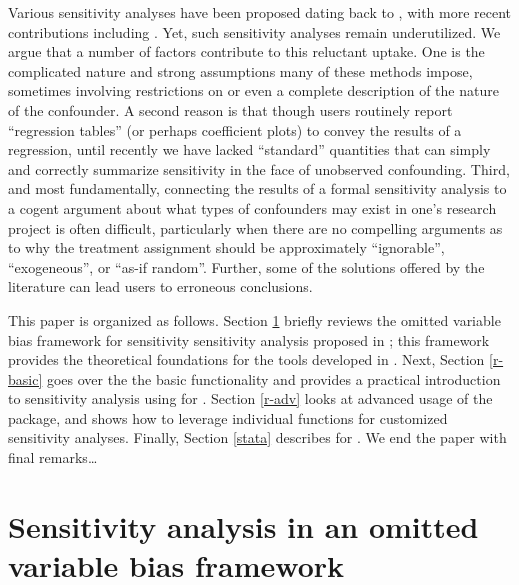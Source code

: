 \documentclass[
]{jss}
\begin{document}
Various sensitivity analyses have been proposed dating back to
\citet{cornfield1959smoking}, with more recent contributions including
\citep{rosenbaum1983assessing, robins1999association, frank:smr2000, rosenbaum2002gamma, imbens2003sensitivity, brumback2004sensitivity, frank:eepa2008, hosman2010sensitivity, imai2010identification, arah2011, blackwell2013selection, frank2013would, carnegie:jree2016, dorie2016flexible, middleton2016bias, oster:jbes2017, cinelli:icml2019, franks:jasa2019}.
Yet, such sensitivity analyses remain underutilized. We argue that a
number of factors contribute to this reluctant uptake. One is the
complicated nature and strong assumptions many of these methods impose,
sometimes involving restrictions on or even a complete description of
the nature of the confounder. A second reason is that though users
routinely report ``regression tables'' (or perhaps coefficient plots) to
convey the results of a regression, until recently we have lacked
``standard'' quantities that can simply and correctly summarize
sensitivity in the face of unobserved confounding. Third, and most
fundamentally, connecting the results of a formal sensitivity analysis
to a cogent argument about what types of confounders may exist in one's
research project is often difficult, particularly when there are no
compelling arguments as to why the treatment assignment should be
approximately ``ignorable'', ``exogeneous'', or ``as-if random''.
Further, some of the solutions offered by the literature can lead users
to erroneous conclusions.

This paper is organized as follows. Section \ref{review} briefly reviews
the omitted variable bias framework for sensitivity sensitivity analysis
proposed in \citet{cinelli:jrssb2019}; this framework provides the
theoretical foundations for the tools developed in .
Next, Section \ref{r-basic} goes over the the basic functionality and
provides a practical introduction to sensitivity analysis using
 for . Section \ref{r-adv} looks at
advanced usage of the  package, and shows how to leverage
individual functions for customized sensitivity analyses. Finally,
Section \ref{stata} describes  for .
We end the paper with final remarks\ldots{}

\hypertarget{review}{%
\section{Sensitivity analysis in an omitted variable bias
framework}\label{review}}
\end{document}
